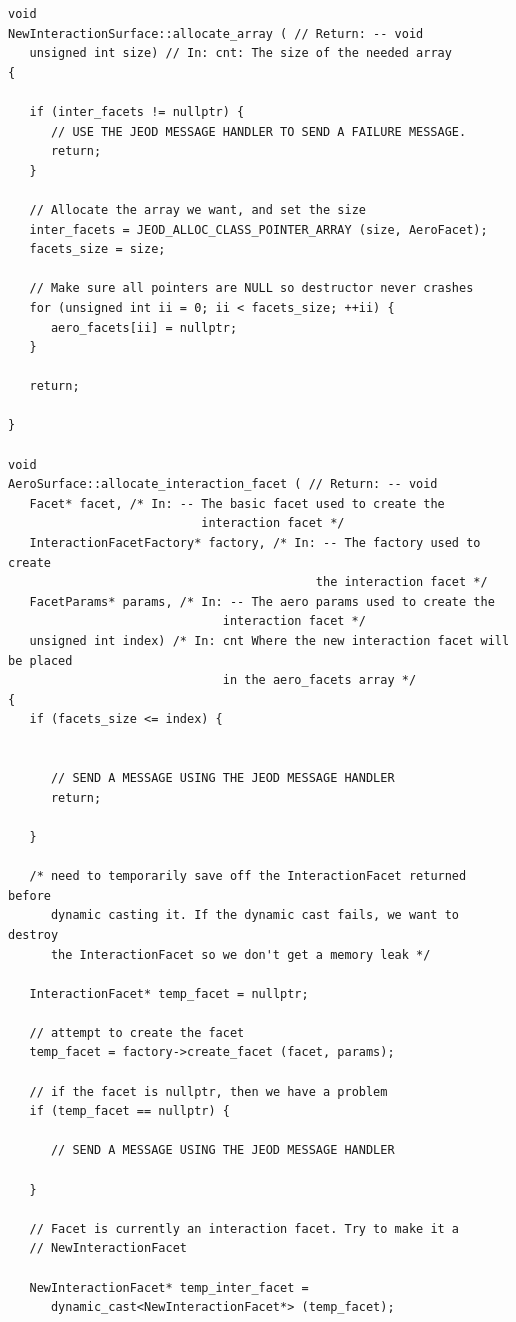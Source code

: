 \begin{verbatim}
void
NewInteractionSurface::allocate_array ( // Return: -- void
   unsigned int size) // In: cnt: The size of the needed array
{

   if (inter_facets != nullptr) {
      // USE THE JEOD MESSAGE HANDLER TO SEND A FAILURE MESSAGE.
      return;
   }

   // Allocate the array we want, and set the size
   inter_facets = JEOD_ALLOC_CLASS_POINTER_ARRAY (size, AeroFacet);
   facets_size = size;

   // Make sure all pointers are NULL so destructor never crashes
   for (unsigned int ii = 0; ii < facets_size; ++ii) {
      aero_facets[ii] = nullptr;
   }

   return;

}

void
AeroSurface::allocate_interaction_facet ( // Return: -- void
   Facet* facet, /* In: -- The basic facet used to create the
                           interaction facet */
   InteractionFacetFactory* factory, /* In: -- The factory used to create
                                           the interaction facet */
   FacetParams* params, /* In: -- The aero params used to create the
                              interaction facet */
   unsigned int index) /* In: cnt Where the new interaction facet will be placed
                              in the aero_facets array */
{
   if (facets_size <= index) {


      // SEND A MESSAGE USING THE JEOD MESSAGE HANDLER
      return;

   }

   /* need to temporarily save off the InteractionFacet returned before
      dynamic casting it. If the dynamic cast fails, we want to destroy
      the InteractionFacet so we don't get a memory leak */

   InteractionFacet* temp_facet = nullptr;

   // attempt to create the facet
   temp_facet = factory->create_facet (facet, params);

   // if the facet is nullptr, then we have a problem
   if (temp_facet == nullptr) {

      // SEND A MESSAGE USING THE JEOD MESSAGE HANDLER

   }

   // Facet is currently an interaction facet. Try to make it a
   // NewInteractionFacet

   NewInteractionFacet* temp_inter_facet = 
      dynamic_cast<NewInteractionFacet*> (temp_facet);



\end{verbatim}
